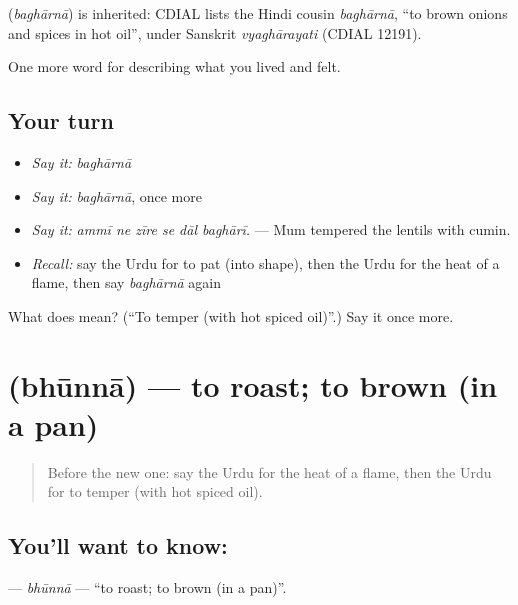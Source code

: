 \begin{cousinweb}
\textbf{} (\emph{baghārnā}) is inherited: CDIAL lists the Hindi cousin \emph{baghārnā}, \textquotedblleft{}to brown onions and spices in hot oil\textquotedblright{}, under Sanskrit \emph{vyaghārayati} (CDIAL 12191).
\end{cousinweb}

\begin{grammarlens}[title={What you've built}]
One more word for describing what you lived and felt.
\end{grammarlens}

\subsection*{Your turn}
\begin{itemize}
\raggedright
  \item \emph{Say it:} \emph{baghārnā}
  \item \emph{Say it:} \emph{baghārnā}, once more
  \item \emph{Say it:} \emph{ammī ne zīre se dāl baghārī.} — Mum tempered the lentils with cumin.
  \item \emph{Recall:} say the Urdu for to pat (into shape), then the Urdu for the heat of a flame, then say \emph{baghārnā} again
\end{itemize}

\begin{tcolorbox}[breakable,colback=teal!4,colframe=teal!35!black,title={Before you move on}]
What does  mean? (\textquotedblleft{}To temper (with hot spiced oil)\textquotedblright{}.) Say it once more.
\end{tcolorbox}
\section[\texorpdfstring{\ur{بھوننا} (bhūnnā)}{بھوننا (bhūnnā)}]{ (bhūnnā) — to roast; to brown (in a pan)}

\label{lesson:UR-C508-bhunna}



\begin{quote}
Before the new one: say the Urdu for the heat of a flame, then the Urdu for to temper (with hot spiced oil).
\end{quote}

\subsection*{You'll want to know: }
\textbf{} — \emph{bhūnnā} — \textquotedblleft{}to roast; to brown (in a pan)\textquotedblright{}.

